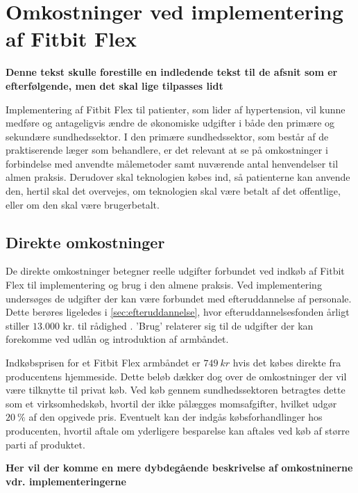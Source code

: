
\section{Omkostninger ved implementering af Fitbit Flex}

\textbf{Denne tekst skulle forestille en indledende tekst til de afsnit som er efterfølgende, men det skal lige tilpasses lidt} 

Implementering af Fitbit Flex til patienter, som lider af hypertension, vil kunne medføre og antageligvis ændre de økonomiske udgifter i både den primære og sekundære sundhedssektor. I den primære sundhedssektor, som består af de praktiserende læger som behandlere, er det relevant at se på omkostninger i forbindelse med anvendte målemetoder samt nuværende antal henvendelser til almen praksis. Derudover skal teknologien købes ind, så patienterne kan anvende den, hertil skal det overvejes, om teknologien skal være betalt af det offentlige, eller om den skal være brugerbetalt. 

\subsection{Direkte omkostninger}
De direkte omkostninger betegner reelle udgifter forbundet ved indkøb af Fitbit Flex til implementering og brug i den almene praksis.  
Ved implementering undersøges de udgifter der kan være forbundet med efteruddannelse af personale. Dette berøres ligeledes i \autoref{sec:efteruddannelse}, hvor efteruddannelsesfonden årligt stiller $13.000$ kr. til rådighed \citep{vedsted2005}.  
'Brug' relaterer sig til de udgifter der kan forekomme ved udlån og introduktion af armbåndet. 

Indkøbsprisen for et Fitbit Flex armbåndet er $749\ kr$ hvis det købes direkte fra producentens hjemmeside. Dette beløb dækker dog over de omkostninger der vil være tilknytte til privat køb. 
Ved køb gennem sundhedssektoren betragtes dette som et virksomhedskøb, hvortil der ikke pålægges momsafgifter, hvilket udgør $20~\%$ af den opgivede pris. 
Eventuelt kan der indgås købsforhandlinger hos producenten, hvortil aftale om yderligere besparelse kan aftales ved køb af større parti af produktet. 

 \textbf{Her vil der komme en mere dybdegående beskrivelse af omkostninerne vdr. implementeringerne}

